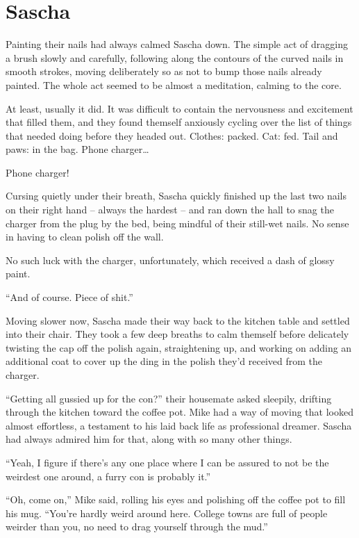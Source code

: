 \chapter{Sascha}

Painting their nails had always calmed Sascha down. The simple act of dragging a brush slowly and carefully, following along the contours of the curved nails in smooth strokes, moving deliberately so as not to bump those nails already painted. The whole act seemed to be almost a meditation, calming to the core.

At least, usually it did. It was difficult to contain the nervousness and excitement that filled them, and they found themself anxiously cycling over the list of things that needed doing before they headed out. Clothes: packed. Cat: fed. Tail and paws: in the bag. Phone charger\ldots{}

Phone charger!

Cursing quietly under their breath, Sascha quickly finished up the last two nails on their right hand -- always the hardest -- and ran down the hall to snag the charger from the plug by the bed, being mindful of their still-wet nails. No sense in having to clean polish off the wall.

No such luck with the charger, unfortunately, which received a dash of glossy paint.

``And of course. Piece of shit.''

Moving slower now, Sascha made their way back to the kitchen table and settled into their chair. They took a few deep breaths to calm themself before delicately twisting the cap off the polish again, straightening up, and working on adding an additional coat to cover up the ding in the polish they'd received from the charger.

``Getting all gussied up for the con?'' their housemate asked sleepily, drifting through the kitchen toward the coffee pot. Mike had a way of moving that looked almost effortless, a testament to his laid back life as professional dreamer. Sascha had always admired him for that, along with so many other things.

``Yeah, I figure if there's any one place where I can be assured to not be the weirdest one around, a furry con is probably it.''

``Oh, come on,'' Mike said, rolling his eyes and polishing off the coffee pot to fill his mug. ``You're hardly weird around here. College towns are full of people weirder than you, no need to drag yourself through the mud.''

